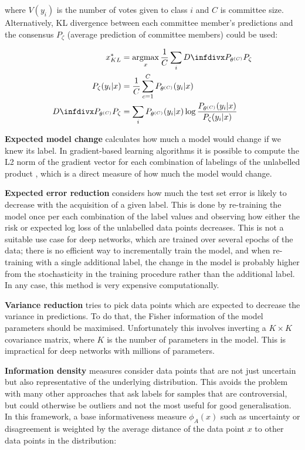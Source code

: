 where $V(y_i)$ is the number of votes given to class $i$ and $C$ is committee size.
Alternatively, KL divergence between each committee member's predictions and the consensus $P_\zeta$ (average prediction of committee members) could be used:

\begin{align}
 x^*_{KL} &= \argmax_x \frac{1}{C} \sum_{i} \infdiv{P_{\theta^{(C)}}}{P_\zeta}\\
 P_\zeta(y_i | x) &= \frac{1}{C} \sum_{c=1}^C P_{\theta^{(C)}}(y_i|x)\\
 \infdiv{P_{\theta^{(C)}}}{P_\zeta} &= \sum_i  P_{\theta^{(C)}}(y_i|x) \log \frac{ P_{\theta^{(C)}}(y_i|x) }{ P_{\zeta}(y_i|x) }
\end{align}

\textbf{Expected model change} calculates how much a model would change if we knew its label.
In gradient-based learning algorithms it is possible to compute the L2 norm of the gradient vector for each combination of labelings of the unlabelled product \cite{model_change}, which is a direct measure of how much the model would change.

\textbf{Expected error reduction} considers how much the test set error is likely to decrease with the acquisition of a given label.
This is done by re-training the model once per each combination of the label values and observing how either the risk or expected log loss of the unlabelled data points decreases.
This is not a suitable use case for deep networks, which are trained over several epochs of the data; there is no efficient way to incrementally train the model, and when re-training with a single additional label, the change in the model is probably higher from the stochasticity in the training procedure rather than the additional label.
In any case, this method is very expensive computationally.

\textbf{Variance reduction} tries to pick data points which are expected to decrease the variance in predictions.
To do that, the Fisher information of the model parameters should be maximised.
Unfortunately this involves inverting a $K \times K$ covariance matrix, where $K$ is the number of parameters in the model.
This is impractical for deep networks with millions of parameters.

\textbf{Information density} measures consider data points that are not just uncertain but also representative of the underlying distribution.
This avoids the problem with many other approaches that ask labels for samples that are controversial, but could otherwise be outliers and not the most useful for good generalisation.
In this framework, a base informativeness measure $\phi_A(x)$ such as uncertainty or disagreement is weighted by the average distance of the data point $x$ to other data points in the distribution:


